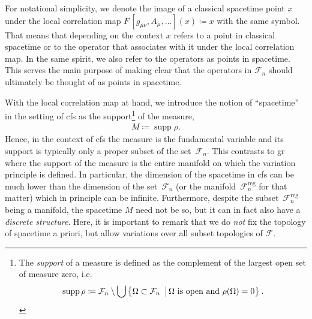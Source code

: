 \documentclass[reqno,11pt]{amsart}
\DeclareMathOperator{\supp}{supp}
\newcommand{\defeq}{\coloneqq}
\newcommand{\F}{{\mathcal{F}}}
\numberwithin{equation}{section}
\begin{document}
For notational simplicity, we denote the image of a classical spacetime point $x$ under the local correlation map
$F\,[g_{\mu\nu}, A_\mu,\dots](x) \defeq x$ with the same symbol.
That means that depending on the context $x$ refers to a point in classical spacetime or to the operator that associates
with it under the local correlation map.
In the same spirit, we also refer to the operators as points in spacetime.
This serves the main purpose of making clear that the operators in $\F_n$ should ultimately be thought of as points in spacetime.

With the local correlation map at hand, we introduce the notion of ``spacetime'' in the setting of \ac{cfs} as the support\footnote{
    The \textit{support} of a measure is defined as the complement of the largest open set of measure zero, i.e.
    \begin{align*}
        \supp \rho \defeq \F_n \setminus \bigcup \big\{ \text{$\Omega \subset \F_n$ \,\big|\,$\Omega$ is open and~$\rho(\Omega)=0$} \big\} \:.
    \end{align*}
}
of the measure,
\begin{align*}
    M \defeq \supp \rho.
\end{align*}
Hence, in the context of \ac{cfs} the measure is the fundamental variable and its support is typically only a proper subset
of the set~$\F_n$.
This contrasts to \ac{gr} where the support of the measure is the entire manifold on which the variation principle is
defined.
In particular, the dimension of the spacetime in \ac{cfs} can be much lower than the dimension of the set~$\F_n$
(or the manifold~$\F_n^{\text{reg}}$ for that matter) which in principle can be infinite.
Furthermore, despite the subset~$\F_n^{\text{reg}}$ being a manifold, the spacetime $M$ need not be so, but it can in fact
also have a \textit{discrete structure}.
Here, it is important to remark that we do \textit{not} fix the topology of spacetime a priori, but allow variations over all subset topologies of $\F$.
\end{document}

